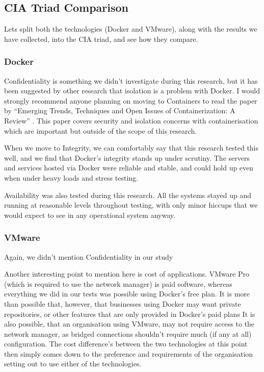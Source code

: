 \subsection{CIA Triad Comparison}
Lets split both the technologies (Docker and VMware), along with the results we have collected, into the CIA triad, and see how they compare.
\subsubsection{Docker}
Confidentiality is something we didn't investigate during this research, but it has been suggested by other research that isolation is a problem with Docker. I would strongly recommend anyone planning on moving to Containers to read the paper by \citeauthor{watanda19} ``Emerging Trends, Techniques and Open Issues of
Containerization: A Review'' \citeyear{watanda19}. This paper covers security and isolation concerns with containerisation which are important but outside of the scope of this research.

When we move to Integrity, we can comfortably say that this research tested this well, and we find that Docker's integrity stands up under scrutiny. The servers and services hosted via Docker were reliable and stable, and could hold up even when under heavy loads and stress testing.

Availability was also tested during this research. All the systems stayed up and running at reasonable levels throughout testing, with only minor hiccups that we would expect to see in any operational system anyway.

\subsubsection{VMware}
Again, we didn't mention Confidentiality in our study


Another interesting point to mention here is cost of applications. VMware Pro (which is required to use the network manager) is paid software, whereas everything we did in our tests was possible using Docker's free plan. It is more than possible that, however, that businesses using Docker may want private repositories, or other features that are only provided in Docker's paid plans It is also possible, that an organisation using VMware, may not require access to the network manager, as bridged connections shouldn't require much (if any at all) configuration. The cost difference's between the two technologies at this point then simply comes down to the preference and requirements of the organisation setting out to use either of the technologies.

